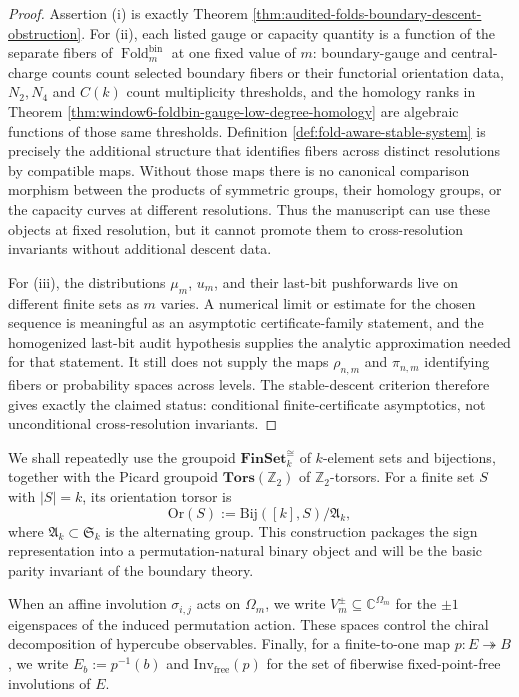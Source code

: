 \documentclass[12pt,a4paper]{article}
\theoremstyle{plain}
\theoremstyle{definition}
\numberwithin{equation}{section}
\newcommand{\CC}{\mathbb{C}}
\newcommand{\ZZ}{\mathbb{Z}}
\newcommand{\Fold}{\operatorname{Fold}}
\begin{document}
\begin{proof}
Assertion \textup{(i)} is exactly Theorem \ref{thm:audited-folds-boundary-descent-obstruction}.  For \textup{(ii)}, each listed gauge or capacity quantity is a function of the separate fibers of \(\Fold_m^{\mathrm{bin}}\) at one fixed value of \(m\): boundary-gauge and central-charge counts count selected boundary fibers or their functorial orientation data, \(N_2,N_4\) and \(C(k)\) count multiplicity thresholds, and the homology ranks in Theorem \ref{thm:window6-foldbin-gauge-low-degree-homology} are algebraic functions of those same thresholds.  Definition \ref{def:fold-aware-stable-system} is precisely the additional structure that identifies fibers across distinct resolutions by compatible maps.  Without those maps there is no canonical comparison morphism between the products of symmetric groups, their homology groups, or the capacity curves at different resolutions.  Thus the manuscript can use these objects at fixed resolution, but it cannot promote them to cross-resolution invariants without additional descent data.

For \textup{(iii)}, the distributions \(\mu_m\), \(u_m\), and their last-bit pushforwards live on different finite sets as \(m\) varies.  A numerical limit or estimate for the chosen sequence is meaningful as an asymptotic certificate-family statement, and the homogenized last-bit audit hypothesis supplies the analytic approximation needed for that statement.  It still does not supply the maps \(\rho_{n,m}\) and \(\pi_{n,m}\) identifying fibers or probability spaces across levels.  The stable-descent criterion therefore gives exactly the claimed status: conditional finite-certificate asymptotics, not unconditional cross-resolution invariants. \qedhere
\end{proof}

We shall repeatedly use the groupoid \(\mathbf{FinSet}_k^{\cong}\) of \(k\)-element sets and bijections, together with the Picard groupoid \(\mathbf{Tors}(\ZZ_2)\) of \(\ZZ_2\)-torsors. For a finite set \(S\) with \(|S|=k\), its orientation torsor is
\[
\mathrm{Or}(S):=\mathrm{Bij}([k],S)\big/\mathfrak A_k,
\]
where \(\mathfrak A_k\subset\mathfrak S_k\) is the alternating group. This construction packages the sign representation into a permutation-natural binary object and will be the basic parity invariant of the boundary theory.

When an affine involution \(\sigma_{i,j}\) acts on \(\Omega_m\), we write \(V_m^\pm\subseteq \CC^{\Omega_m}\) for the \(\pm 1\) eigenspaces of the induced permutation action. These spaces control the chiral decomposition of hypercube observables. Finally, for a finite-to-one map \(p:E\twoheadrightarrow B\), we write \(E_b:=p^{-1}(b)\) and \(\mathrm{Inv}_{\mathrm{free}}(p)\) for the set of fiberwise fixed-point-free involutions of \(E\).
\end{document}
